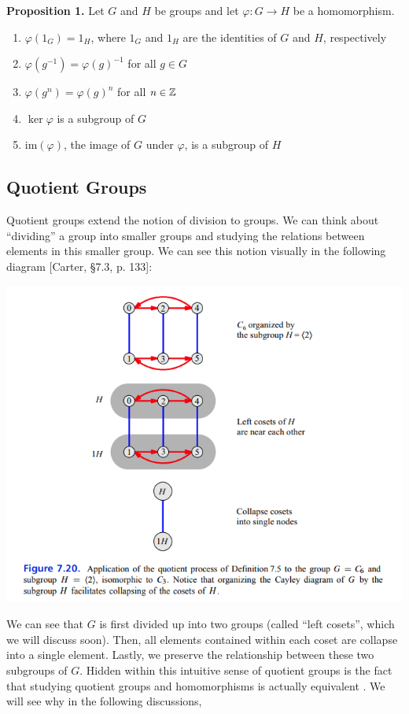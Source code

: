 \documentclass[11pt, reqno]{amsart}
\theoremstyle{plain}
\theoremstyle{definition}
\theoremstyle{example}
\begin{document}
\textbf{Proposition 1.} Let $G$ and $H$ be groups and let $\varphi: G \to H$ be a homomorphism.
\begin{enumerate}
\item $\varphi(1_G) = 1_H$, where $1_G$ and $1_H$ are the identities of $G$ and $H$, respectively
\item $\varphi(g^{-1}) = \varphi(g)^{-1}$ for all $g \in G$
\item $\varphi(g^n) = \varphi(g)^n$ for all $n \in \mathbb{Z}$
\item $\ker \varphi$ is a subgroup of $G$
\item $\text{im}(\varphi)$, the image of $G$ under $\varphi$, is a subgroup of $H$
\end{enumerate}

\newpage
\subsection{Quotient Groups}

\par
Quotient groups extend the notion of division to groups. We can think about ``dividing'' a group into smaller groups and studying the relations between elements in this smaller group. We can see this notion visually in the following diagram [Carter, \S 7.3, p. 133]:

\includegraphics[scale=1]{quotient}

\par
We can see that $G$ is first divided up into two groups (called ``left cosets'', which we will discuss soon). Then, all elements contained within each coset are collapse into a single element. Lastly, we preserve the relationship between these two subgroups of $G$. Hidden within this intuitive sense of quotient groups is the fact that studying quotient groups and homomorphisms is actually equivalent \cite{dummit, quotientwiki}. We will see why in the following discussions,
\end{document}
